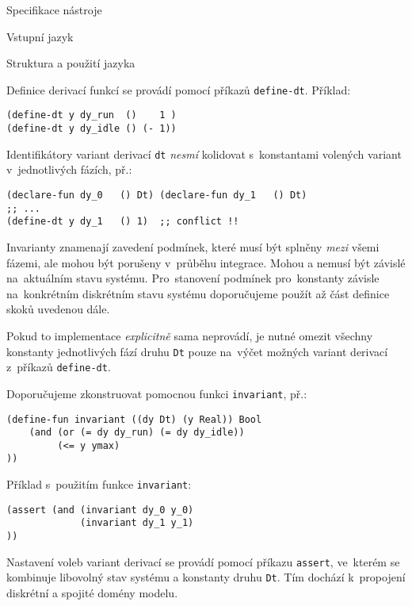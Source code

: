 \documentclass[thesis=M,czech]{FITthesis}[2012/06/26]
\newcommand{\id}[1]{\texttt{#1}}
\newcommand{\hl}[1]{\textit{#1}}
\begin{document}
\begin{section}{Specifikace nástroje}
\begin{subsection}{Vstupní jazyk}
\begin{subsubsection}{Struktura a použití jazyka}

\begin{paragraph}{Definice derivací funkcí}
\label{p:design:spec:ilang:struct:ode}
se provádí pomocí příkazů \id{define\--dt}.
Příklad:
\begin{Verbatim}[samepage=true]
(define-dt y dy_run  ()    1 )
(define-dt y dy_idle () (- 1))
\end{Verbatim}

Identifikátory variant derivací \id{dt}
\hl{nesmí} kolidovat s~konstantami
volených variant v~jednotlivých fázích, př.:
\begin{Verbatim}[samepage=true]
(declare-fun dy_0   () Dt) (declare-fun dy_1   () Dt)
;; ...
(define-dt y dy_1   () 1)  ;; conflict !!
\end{Verbatim}
\end{paragraph} %


\begin{paragraph}{Invarianty}
\label{p:design:spec:ilang:struct:inv}
znamenají zavedení podmínek,
které musí být splněny \hl{mezi} všemi fázemi,
ale mohou být porušeny v~průběhu integrace.
Mohou a nemusí být závislé na~aktuálním stavu systému.
Pro~stanovení podmínek pro~konstanty závisle
na~konkrétním diskrétním stavu systému
doporučujeme použít až část definice skoků uvedenou dále.

Pokud to implementace \hl{explicitně} sama neprovádí,
je nutné omezit všechny konstanty jednotlivých fází druhu \id{Dt}
pouze na~výčet možných variant derivací z~příkazů \id{define\--dt}.

Doporučujeme zkonstruovat pomocnou funkci \id{invariant}, př.:
\begin{Verbatim}[samepage=true]
(define-fun invariant ((dy Dt) (y Real)) Bool
    (and (or (= dy dy_run) (= dy dy_idle))
         (<= y ymax)
))
\end{Verbatim}

Příklad s~použitím funkce \id{invariant}:
\begin{Verbatim}[samepage=true]
(assert (and (invariant dy_0 y_0)
             (invariant dy_1 y_1)
))
\end{Verbatim}
\end{paragraph} %


\begin{paragraph}{Nastavení voleb variant derivací}
\label{p:design:spec:ilang:struct:connect}
se provádí pomocí příkazu \id{assert},
ve~kterém se kombinuje libovolný stav systému
a konstanty druhu \id{Dt}.
Tím dochází k~propojení diskrétní a spojité domény modelu.


\end{paragraph}
\end{subsubsection}
\end{subsection}
\end{section}
\end{document}
